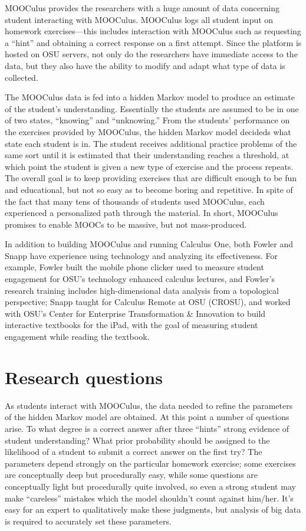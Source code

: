 \documentclass[12pt]{article}
\begin{document}
MOOCulus provides the researchers with a huge amount of data
concerning student interacting with MOOCulus. MOOCulus logs all
student input on homework exercises---this includes interaction with
MOOCulus such as requesting a ``hint'' and obtaining a correct
response on a first attempt.  Since the platform is hosted on OSU
servers, not only do the researchers have immediate access to the
data, but they also have the ability to modify and adapt what type of
data is collected. 


The MOOCulus data is fed into a hidden Markov model to produce an
estimate of the student's understanding. Essentially the students are
assumed to be in one of two states, ``knowing'' and ``unknowing.''
From the students' performance on the exercises provided by MOOCulus,
the hidden Markov model decideds what state each student is in. The
student receives additional practice problems of the same sort until
it is estimated that their understanding reaches a threshold, at which
point the student is given a new type of exercise and the process
repeats.  The overall goal is to keep providing exercises that are
difficult enough to be fun and educational, but not so easy as to
become boring and repetitive.  In spite of the fact that many tens of
thousands of students used MOOCulus, each experienced a personalized
path through the material.  In short, MOOCulus promises to enable
MOOCs to be massive, but not mass-produced.

In addition to building MOOCulus and running Calculus One, both Fowler
and Snapp have experience using technology and analyzing its
effectiveness.  For example, Fowler built the mobile phone clicker
used to measure student engagement for OSU's technology enhanced
calculus lectures, and Fowler's research training includes
high-dimensional data analysis from a topological perspective; Snapp
taught for Calculus Remote at OSU (CROSU), and worked with OSU's
Center for Enterprise Transformation \& Innovation to build
interactive textbooks for the iPad, with the goal of measuring student
engagement while reading the textbook.

\section{Research questions}

As students interact with MOOCulus, the data needed to refine the
parameters of the hidden Markov model are obtained.  At this point a
number of questions arise. To what degree is a correct answer after
three ``hints'' strong evidence of student understanding?  What prior
probability should be assigned to the likelihood of a student to
submit a correct answer on the first try?  The parameters depend
strongly on the particular homework exercise; some exercises are
conceptually deep but procedurally easy, while some questions are
conceptually light but procedurally quite involved, so even a strong
student may make ``careless'' mistakes which the model shouldn't count
against him/her.  It's easy for an expert to qualitatively make these
judgments, but analysis of big data is required to accurately set
these parameters.
\end{document}
